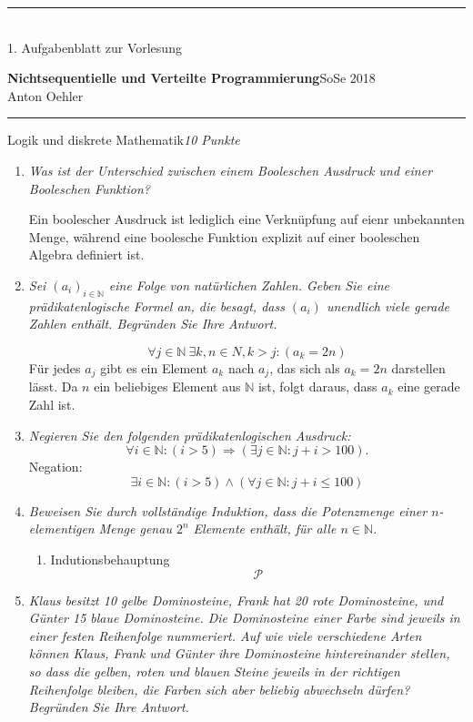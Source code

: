 \documentclass[a4paper,twoside,12pt]{article}
\newcommand{\ZETTELNUMMER}{1}
\newcounter{AUFGNR}
\newcommand{\AUFGABE}[2]{\vspace{0.3cm}\item[Aufgabe~\arabic{AUFGNR}]\stepcounter{AUFGNR} #1\hfill\emph{#2}}
\newcommand{\N}{\mathbb{N}}
\begin{document}
\pagestyle{empty}
\hrule\medskip
\rule{0ex}{0ex}\\[-1ex]
\ZETTELNUMMER. Aufgabenblatt zur Vorlesung

\smallskip
\noindent
\large
\textbf{Nichtsequentielle und Verteilte Programmierung}\hfill SoSe
2018 \\[0.5ex]
\normalsize
Anton Oehler

\medskip\hrule

\begin{description}
\AUFGABE{Logik und diskrete Mathematik}{10 Punkte}

\begin{enumerate}
\item \emph{Was ist der Unterschied zwischen einem Booleschen
  Ausdruck und einer Booleschen Funktion?}

  Ein boolescher Ausdruck ist lediglich eine Verkn\"upfung auf eienr unbekannten
  Menge, w\"ahrend eine boolesche Funktion explizit  auf einer booleschen Algebra
  definiert ist.
\item \emph{Sei $(a_i)_{i \in \N}$ eine Folge von nat\"urlichen Zahlen.
  Geben Sie eine pr\"adikatenlogische Formel an, die besagt,
  dass $(a_i)$ unendlich viele gerade Zahlen enth\"alt.
  Begr\"unden Sie Ihre Antwort.}

  \[
    \forall j \in \N \: \exists k,n \in N, k > j: (a_k = 2n)
  \]
  F\"ur jedes $a_j$ gibt es ein Element $a_k$ nach $a_j$, das sich als
  $a_k = 2n$ darstellen lässt. Da $n$ ein beliebiges Element aus $\N$ ist,
  folgt daraus, dass $a_k$ eine gerade Zahl ist.
\item \emph{Negieren Sie den folgenden pr\"adikatenlogischen
  Ausdruck:}
    \[
      \forall i \in \N: (i > 5) \Rightarrow (\exists j \in \N: j + i > 100).
    \]
  Negation:
    \[
      \exists i \in \N: (i > 5) \wedge (\forall j \in \N : j + i \leq 100)
    \]
\item \emph{Beweisen Sie durch vollst\"andige Induktion, dass die Potenzmenge
  einer $n$-elementigen Menge genau $2^n$ Elemente enth\"alt, f\"ur alle
  $n \in \N$.}

  \begin{enumerate}
    \item Indutionsbehauptung
    \[
      \mathcal{P}
    \]
  \end{enumerate}
\item \emph{Klaus besitzt 10 gelbe Dominosteine, Frank hat 20 rote
  Dominosteine, und G\"unter 15 blaue Dominosteine.
  Die Dominosteine einer Farbe sind jeweils in einer festen Reihenfolge
  nummeriert.
  Auf wie viele verschiedene Arten k\"onnen Klaus, Frank und G\"unter
  ihre Dominosteine hintereinander stellen, so dass die gelben, roten
  und blauen Steine jeweils in der richtigen Reihenfolge bleiben, die
  Farben sich aber beliebig abwechseln d\"urfen?
  Begr\"unden Sie Ihre Antwort.}


\end{enumerate}
\end{description}
\end{document}
